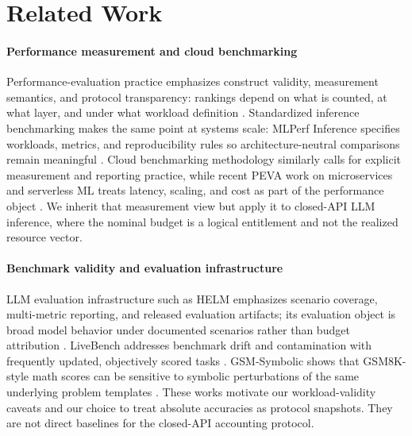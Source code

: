 \section{Related Work}
\label{sec:related}

\paragraph{Performance measurement and cloud benchmarking}
Performance-evaluation practice emphasizes construct validity, measurement semantics, and protocol
transparency: rankings depend on what is counted, at what layer, and under what workload definition
\citep{jain1991,lilja2000,georges2007}. Standardized inference benchmarking makes the same point at
systems scale: MLPerf Inference specifies workloads, metrics, and reproducibility rules so
architecture-neutral comparisons remain meaningful \citep{mlperf_inference}. Cloud benchmarking
methodology similarly calls for explicit measurement and reporting practice, while recent PEVA work
on microservices and serverless ML treats latency, scaling, and cost as part of the performance
object \citep{papadopoulos2021cloudmethodology,guo2023pobo,ali2025serverlessmltraining}. We inherit
that measurement view but apply it to closed-API LLM inference, where the nominal budget is a
logical entitlement and not the realized resource vector.

\paragraph{Benchmark validity and evaluation infrastructure}
LLM evaluation infrastructure such as HELM emphasizes scenario coverage, multi-metric reporting, and
released evaluation artifacts; its evaluation object is broad model behavior under documented
scenarios rather than budget attribution \citep{helm}. LiveBench addresses benchmark drift and
contamination with frequently updated, objectively scored tasks \citep{livebench}. GSM-Symbolic
shows that GSM8K-style math scores can be sensitive to symbolic perturbations of the same underlying
problem templates \citep{gsm_symbolic}. These works motivate our workload-validity caveats and our
choice to treat absolute accuracies as protocol snapshots. They are not direct baselines for the
closed-API accounting protocol.

